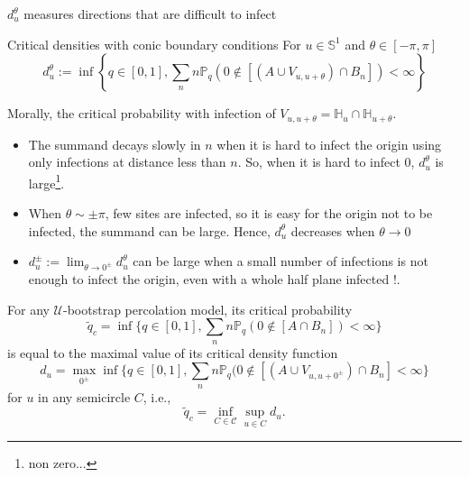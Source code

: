 
\begin{frame}{$d_u^\theta$ measures directions that are difficult to infect}
	\begin{block}{Critical densities with conic boundary conditions}
		For $u\in \mathbb{S}^1$ and $\theta\in[-\pi, \pi]$
		$$d_u^\theta := \inf\left\{q\in[0,1], \sum_n n\mathbb{P}_q(0\not\in [(A\cup V_{u,u+\theta})\cap B_n]) < \infty\right\}$$
	\end{block}
	Morally, the critical probability with infection of $V_{u,u+\theta} = \mathbb{H}_u \cap \mathbb{H}_{u+\theta}$. 
	\begin{itemize}
		\item The summand decays slowly in $n$ when it is hard to infect the origin using only infections at distance less than $n$. So, when it is hard to infect 0,  $d_u^\theta$ is large\footnote{non zero...}.
		\item When $\theta \sim \pm \pi$, few sites are infected, so it is easy for the origin not to be infected, the summand can be large. Hence, $d_u^\theta$ decreases when $\theta\to 0$
		\item $d_u^\pm := \lim_{\theta \to 0^\pm} d_u^\theta$ can be large when a small number of infections is not enough to infect the origin, even with a whole half plane infected !. 
	\end{itemize}
\end{frame}

\begin{frame}
	\begin{theorem}
		For any $\mathcal{U}$-bootstrap percolation model, its critical probability
		\begin{equation*}
			\tilde q_c = \inf\{q\in[0,1], \sum_n n\mathbb{P}_q(0\not\in [A\cap B_n]) < \infty\}
		\end{equation*}
		is equal to the maximal value of its critical density function
		\begin{equation*}
			d_u = \max_{0^\pm} \inf\{q\in[0,1], \sum_n n\mathbb{P}_q(0\not\in[(A\cup V_{u, u + 0^\pm})\cap B_n] < \infty\}
		\end{equation*}
		for $u$ in any semicircle $C$, i.e.,
		\begin{equation*}
			\tilde q_c = \inf_{C\in \mathcal{C}} \sup_{u\in C} d_u.
		\end{equation*}

	\end{theorem}
\end{frame}

